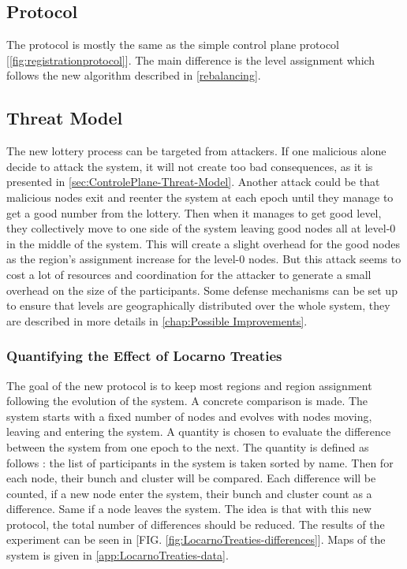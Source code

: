 \documentclass[a4paper,11pt,oneside]{report}
\begin{document}
\subsection{Protocol}
The protocol is mostly the same as the simple control plane protocol [\autoref{fig:registrationprotocol}]. The main difference is the level assignment
which follows the new algorithm described in \autoref{rebalancing}. 

\subsection{Threat Model}

The new lottery process can be targeted from attackers. If one malicious alone decide to attack the system, it will not create too
bad consequences, as it is presented in \autoref{sec:ControlePlane-Threat-Model}. Another attack could be that malicious nodes exit and reenter the system at
each epoch until they manage to get a good number from the lottery. Then when
it manages to get good level, they collectively move to one side of the system
leaving good nodes all at level-0 in the middle of the system. This will create
a slight overhead for the good nodes as the region’s assignment increase for
the level-0 nodes. But this attack seems to cost a lot of resources and
coordination for the attacker to generate a small overhead on the size of the
participants. Some defense mechanisms can be set up to ensure that levels are geographically
distributed over the whole system, they are described in more details in
\autoref{chap:Possible Improvements}.

\subsubsection{Quantifying the Effect of Locarno Treaties}
The goal of the new protocol is to keep most regions and region assignment
following the evolution of the system. A concrete comparison is made. The system starts with a fixed number of nodes
and evolves with nodes moving, leaving and entering the system. A quantity is
chosen to evaluate the difference between the system from one epoch to the
next. The quantity is defined as follows :  the list of participants in the
system is taken sorted by name. Then for each node, their bunch and cluster
will be compared. Each difference will be counted, if a new node enter the
system, their bunch and cluster count as a difference. Same if a node leaves
the system. The idea is that with this new protocol, the total number of differences should be
reduced. The results of the experiment can be seen in [FIG. \autoref{fig:LocarnoTreaties-differences}]. Maps of
the system is given in \autoref{app:LocarnoTreaties-data}.
\end{document}
